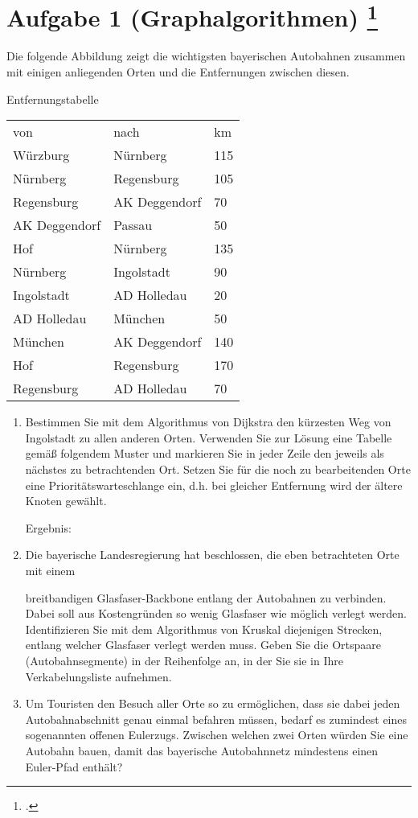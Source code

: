 \documentclass{lehramt-informatik-aufgabe}
\begin{document}
\section{Aufgabe 1 (Graphalgorithmen)
\footcite{66115:2017:03}}

Die folgende Abbildung zeigt die wichtigsten bayerischen Autobahnen
zusammen mit einigen anliegenden Orten und die Entfernungen zwischen
diesen.

Entfernungstabelle

\begin{tabular}{lll}
von & nach & km\\
Würzburg & Nürnberg & 115\\
Nürnberg & Regensburg & 105\\
Regensburg & AK Deggendorf & 70\\
AK Deggendorf & Passau & 50\\
Hof & Nürnberg & 135\\
Nürnberg & Ingolstadt & 90\\
Ingolstadt & AD Holledau & 20\\
AD Holledau & München & 50\\
München & AK Deggendorf & 140\\
Hof & Regensburg & 170\\
Regensburg & AD Holledau & 70\\
\end{tabular}

\begin{enumerate}


\item Bestimmen Sie mit dem Algorithmus von Dijkstra den kürzesten Weg
von Ingolstadt zu allen anderen Orten. Verwenden Sie zur Lösung eine
Tabelle gemäß folgendem Muster und markieren Sie in jeder Zeile den
jeweils als nächstes zu betrachtenden Ort. Setzen Sie für die noch zu
bearbeitenden Orte eine Prioritätswarteschlange ein, d.h. bei gleicher
Entfernung wird der ältere Knoten gewählt.

Ergebnis:


\item Die bayerische Landesregierung hat beschlossen, die eben
betrachteten Orte mit einem

breitbandigen Glasfaser-Backbone entlang der Autobahnen zu verbinden.
Dabei soll aus Kostengründen so wenig Glasfaser wie möglich verlegt
werden. Identifizieren Sie mit dem Algorithmus von Kruskal diejenigen
Strecken, entlang welcher Glasfaser verlegt werden muss. Geben Sie die
Ortspaare (Autobahnsegmente) in der Reihenfolge an, in der Sie sie in
Ihre Verkabelungsliste aufnehmen.

\item Um Touristen den Besuch aller Orte so zu ermöglichen, dass sie
dabei jeden Autobahnabschnitt genau einmal befahren müssen, bedarf es
zumindest eines sogenannten offenen Eulerzugs. Zwischen welchen zwei
Orten würden Sie eine Autobahn bauen, damit das bayerische Autobahnnetz
mindestens einen Euler-Pfad enthält?
\end{enumerate}
\end{document}
